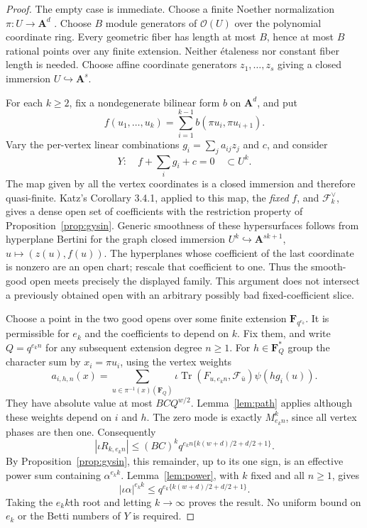 \begin{proof}
The empty case is immediate.  Choose a finite Noether normalization
$\pi:U\to\mathbf A^d$ \cite[Lemma 10.115.4, Tag 00OY]{StacksNN}.
Choose $B$ module generators of $\mathcal O(U)$ over the polynomial
coordinate ring.  Every geometric fiber has length at most $B$, hence
at most $B$ rational points over any finite extension.  Neither
\'etaleness nor constant fiber length is needed.
Choose affine coordinate generators $z_1,\ldots,z_s$ giving a closed
immersion $U\hookrightarrow\mathbf A^s$.

For each $k\ge2$, fix a nondegenerate bilinear form $b$ on
$\mathbf A^d$, and put
\[
 f(u_1,\ldots,u_k)=\sum_{i=1}^{k-1}b(\pi u_i,\pi u_{i+1}).
\]
Vary the per-vertex linear combinations $g_i=\sum_j a_{ij}z_j$ and $c$,
and consider
\begin{equation}\label{eq:pathsection}
 Y:\quad f+\sum_i g_i+c=0\quad\subset U^k.
\end{equation}
The map given by all the vertex coordinates is a closed immersion and
therefore quasi-finite.  Katz's Corollary 3.4.1, applied to this map,
the \emph{fixed} $f$, and $\mathcal F_k^\vee$, gives a dense open set of
coefficients with the restriction property of Proposition~\ref{prop:gysin}.
Generic smoothness of these hypersurfaces follows from hyperplane
Bertini for the graph closed immersion
$U^k\hookrightarrow\mathbf A^{sk+1}$, $u\mapsto(z(u),f(u))$.
The hyperplanes whose coefficient of the last coordinate is nonzero are
an open chart; rescale that coefficient to one.  Thus the smooth-good
open meets precisely the displayed family.  This argument does not
intersect a previously obtained open with an arbitrary possibly bad
fixed-coefficient slice.

Choose a point in the two good opens over some finite extension
$\mathbf F_{q^{e_k}}$.  It is permissible for $e_k$ and the coefficients
to depend on $k$.  Fix them, and write $Q=q^{e_kn}$ for any subsequent
extension degree $n\ge1$.  For $h\in\mathbf F_Q^*$ group the character
sum by $x_i=\pi u_i$, using the vertex weights
\[
 a_{i,h,n}(x)=\sum_{u\in\pi^{-1}(x)(\mathbf F_Q)}
       \iota\operatorname{Tr}(F_{u,e_kn},\mathcal F_{\bar u})
                         \psi(hg_i(u)).
\]
They have absolute value at most $BC Q^{w/2}$.  Lemma~\ref{lem:path}
applies although these weights depend on $i$ and $h$.  The zero mode
is exactly $M_{e_kn}^k$, since all vertex phases are then one.
Consequently
\begin{equation}\label{eq:parsevalbound}
 |\iota R_{k,e_kn}|\le(BC)^k
       q^{e_kn\{k(w+d)/2+d/2+1\}}.
\end{equation}
By Proposition~\ref{prop:gysin}, this remainder, up to its one sign,
is an effective power sum containing $\alpha^{e_kk}$.
Lemma~\ref{lem:power}, with $k$ fixed and all $n\ge1$, gives
\[
 |\iota\alpha|^{e_kk}
       \le q^{e_k\{k(w+d)/2+d/2+1\}}.
\]
Taking the $e_kk$th root and letting $k\to\infty$ proves the result.
No uniform bound on $e_k$ or the Betti numbers of $Y$ is required.
\end{proof}

